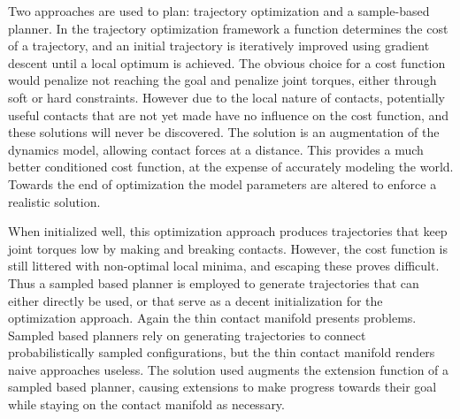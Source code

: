 \documentclass[../thesis.tex]{subfiles}
\begin{document}
Two approaches are used to plan: trajectory optimization and a sample-based planner.
In the trajectory optimization framework a function determines the cost of a trajectory, and an initial trajectory is iteratively improved using gradient descent until a local optimum is achieved.
The obvious choice for a cost function would penalize not reaching the goal and penalize joint torques, either through soft or hard constraints.
However due to the local nature of contacts, potentially useful contacts that are not yet made have no influence on the cost function, and these solutions will never be discovered.
The solution is an augmentation of the dynamics model, allowing contact forces at a distance.
This provides a much better conditioned cost function, at the expense of accurately modeling the world.
Towards the end of optimization the model parameters are altered to enforce a realistic solution.

When initialized well, this optimization approach produces trajectories that keep joint torques low by making and breaking contacts.
However, the cost function is still littered with non-optimal local minima, and escaping these proves difficult.
Thus a sampled based planner is employed to generate trajectories that can either directly be used, or that serve as a decent initialization for the optimization approach.
Again the thin contact manifold presents problems.
Sampled based planners rely on generating trajectories to connect probabilistically sampled configurations, but the thin contact manifold renders naive approaches useless.
The solution used augments the extension function of a sampled based planner, causing extensions to make progress towards their goal while staying on the contact manifold as necessary.
\end{document}
